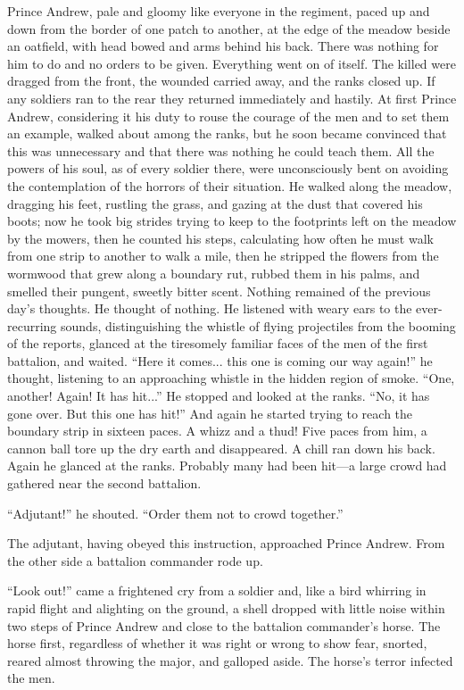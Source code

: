 Prince Andrew, pale and gloomy like everyone in the regiment,
paced up and down from the border of one patch to another, at the
edge of the meadow beside an oatfield, with head bowed and arms
behind his back.  There was nothing for him to do and no orders
to be given. Everything went on of itself. The killed were
dragged from the front, the wounded carried away, and the ranks
closed up. If any soldiers ran to the rear they returned
immediately and hastily. At first Prince Andrew, considering it
his duty to rouse the courage of the men and to set them an
example, walked about among the ranks, but he soon became
convinced that this was unnecessary and that there was nothing he
could teach them. All the powers of his soul, as of every soldier
there, were unconsciously bent on avoiding the contemplation of
the horrors of their situation. He walked along the meadow,
dragging his feet, rustling the grass, and gazing at the dust
that covered his boots; now he took big strides trying to keep to
the footprints left on the meadow by the mowers, then he counted
his steps, calculating how often he must walk from one strip to
another to walk a mile, then he stripped the flowers from the
wormwood that grew along a boundary rut, rubbed them in his
palms, and smelled their pungent, sweetly bitter scent. Nothing
remained of the previous day's thoughts. He thought of
nothing. He listened with weary ears to the ever-recurring
sounds, distinguishing the whistle of flying projectiles from the
booming of the reports, glanced at the tiresomely familiar faces
of the men of the first battalion, and waited.  ``Here it
comes... this one is coming our way again!'' he thought,
listening to an approaching whistle in the hidden region of
smoke. ``One, another! Again! It has hit...'' He stopped and
looked at the ranks. ``No, it has gone over. But this one has
hit!'' And again he started trying to reach the boundary strip in
sixteen paces. A whizz and a thud! Five paces from him, a cannon
ball tore up the dry earth and disappeared. A chill ran down his
back. Again he glanced at the ranks. Probably many had been
hit---a large crowd had gathered near the second battalion.

``Adjutant!'' he shouted. ``Order them not to crowd together.''

The adjutant, having obeyed this instruction, approached Prince
Andrew.  From the other side a battalion commander rode up.

``Look out!'' came a frightened cry from a soldier and, like a
bird whirring in rapid flight and alighting on the ground, a
shell dropped with little noise within two steps of Prince Andrew
and close to the battalion commander's horse. The horse first,
regardless of whether it was right or wrong to show fear,
snorted, reared almost throwing the major, and galloped
aside. The horse's terror infected the men.

